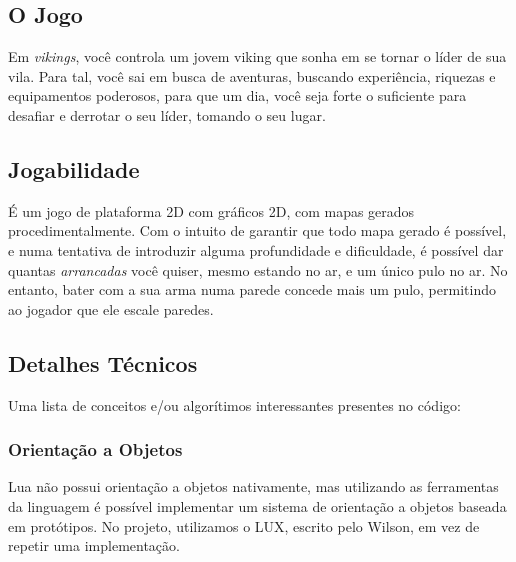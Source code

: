   \addtocounter{footnote}{-3}


  \subsection{O Jogo}
    Em \textit{vikings}, você controla um jovem viking que sonha em se tornar o líder de sua vila. Para tal,
    você sai em busca de aventuras, buscando experiência, riquezas e equipamentos poderosos, para que um dia,
    você seja forte o suficiente para desafiar e derrotar o seu líder, tomando o seu lugar.
        
  \subsection{Jogabilidade}
    É um jogo de plataforma 2D com gráficos 2D, com mapas gerados procedimentalmente. Com o intuito de garantir
    que todo mapa gerado é possível, e numa tentativa de introduzir alguma profundidade e dificuldade, é
    possível dar quantas \textit{arrancadas} você quiser, mesmo estando no ar, e um único pulo no ar. No
    entanto, bater com a sua arma numa parede concede mais um pulo, permitindo ao jogador que ele escale
    paredes.
    
  \subsection{Detalhes Técnicos}
    Uma lista de conceitos e/ou algorítimos interessantes presentes no código:
    
    \subsubsection{Orientação a Objetos}
      Lua não possui orientação a objetos nativamente, mas utilizando as ferramentas da linguagem é possível
      implementar um sistema de orientação a objetos baseada em protótipos.
      No projeto, utilizamos o LUX\footnotemark{}, escrito pelo Wilson, em vez de repetir uma implementação.
      
